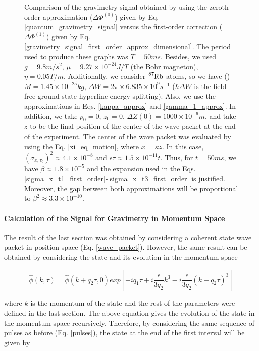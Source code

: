 \documentclass{article}
\begin{document}
\begin{figure}
     \caption{Comparison of the gravimetry signal obtained by using the zeroth-order approximation ($\Delta \Phi ^{(0)}$) given by Eq. \ref{quantum_gravimetry_signal} versus the first-order correction ($\Delta \Phi ^{(1)}$) given by Eq. \ref{gravimetry_signal_first_order_approx_dimensional}. The period used to produce these graphs was $T=50ms$. Besides, we used $g=9.8m/s^{2}$, $\mu=9.27\times10^{-24} J/T$ (the Bohr magneton), $\eta=0.05 T/m$. Additionally, we consider $\ce{^{87}_{}Rb}$ atoms, so we have (\cite{Bunge1993}\cite{KAUSHALSK1970}) $M=1.45\times10^{-25}kg$, $\Delta W=2\pi\times6.835\times10^{9}s^{-1}$ ($\hbar \Delta W $ is the field-free ground state hyperfine energy splitting). Also, we use the approximations in Eqs. \ref{kappa_approx} and \ref{gamma_1_approx}. In addition, we take $p_{0}=0$, $z_{0}=0$, $\Delta Z(0)=1000\times10^{-6}m$, and take $z$ to be the final position of the center of the wave packet at the end of the experiment. The center of the wave packet was evaluated by using the Eq. \ref{xi_eq_motion}, where $x=\kappa z$. In this case, $(\sigma_{x, \tau_{0}})^{2} \approx 4.1 \times 10^{-8}$ and $\epsilon \tau \approx 1.5 \times 10^{-11} t$. Thus, for $t=50ms$, we have $\beta \approx 1.8 \times 10^{-5}$ and the expansion used in the Eqs. \ref{sigma_x_t1_first_order}-\ref{sigma_x_t3_first_order} is justified. Moreover, the gap between both approximations will be proportional to $\beta ^2 \approx 3.3 \times 10^{-10}$.}
     \label{phase_graph_first_order}
\end{figure}


\paragraph{Calculation of the Signal for Gravimetry in Momentum Space}
The result of the last section was obtained by considering a coherent state wave packet in position space (Eq. \ref{wave_packet}). However, the same result can be obtained by considering the state and its evolution in the momentum space \cite{Castanos2014}

\begin{equation}
\widehat{\phi}(k, \tau) = \widehat{\phi}(k + q_{2}\tau, 0) exp\left[-i q_{1} \tau + i \frac{\epsilon}{3q_{2}} k^{3} - i \frac{\epsilon}{3q_{2}} (k + q_{2} \tau)^{3} \right]
\end{equation}

where $k$ is the momentum of the state and the rest of the parameters were defined in the last section. The above equation gives the evolution of the state in the momentum space recursively. Therefore, by considering the same sequence of pulses as before (Eq. \ref{pulses}), the state at the end of the first interval will be given by
\end{document}
